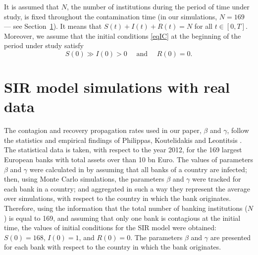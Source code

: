 \documentclass[a4paper,10pt,twoside]{article}
\begin{document}
It is assumed that $N$, the number of institutions during the period of time under study,
is fixed throughout the contamination time (in our simulations, $N=169$ --- see Section~\ref{s3}). 
It means that $S(t)+I(t)+R(t) = N$ for all $t\in [0, T]$. Moreover, we assume that the initial 
conditions \eqref{eqIC} at the beginning of the period under study satisfy
\begin{equation}
\label{eq:IC:assump}
S(0)\gg I(0)>0 \quad \text{ and } \quad R(0)=0.
\end{equation}


\section{SIR model simulations with real data}
\label{s3}

The contagion and recovery propagation rates used in our paper, $\beta$ and $\gamma$, 
follow the statistics and empirical findings of Philippas, Koutelidakis and Leontitsis \cite{[24]}. 
The statistical data is taken, with respect to the year 2012, for the 169 largest European banks 
with total assets over than 10 bn Euro. The values of parameters $\beta$ and $\gamma$  
were calculated in \cite{[24]} by assuming that all banks of a country are infected; 
then, using Monte Carlo simulations, the parameters $\beta$ and $\gamma$ were tracked 
for each bank in a country; and aggregated in such a way they represent the average over simulations, 
with respect to the country in which the bank originates. Therefore, using the information 
that the total number of banking institutions ($N$) is equal to 169, and assuming that 
only one bank is contagious at the initial time, the values of initial conditions 
for the SIR model were obtained: $S(0)=168$, $I(0)=1$, and $R(0)=0$. The parameters 
$\beta$ and $\gamma$ are presented for each bank with respect to the country 
in which the bank originates.
\end{document}
